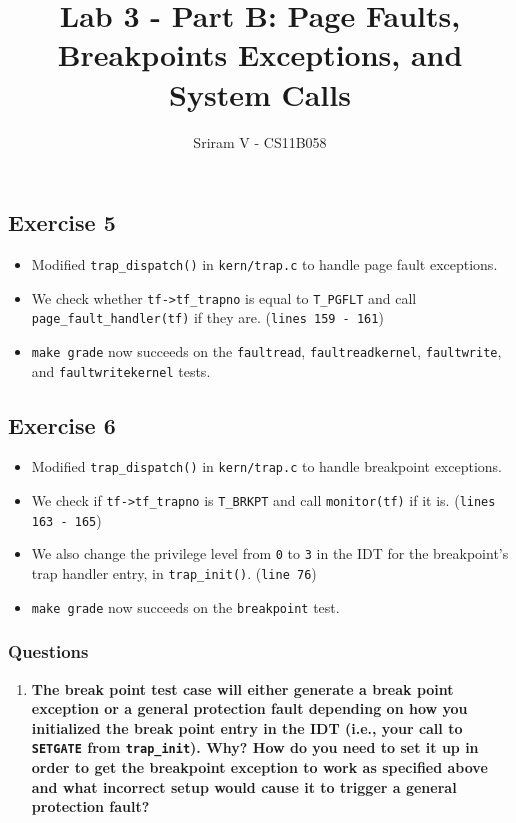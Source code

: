 \documentclass[]{article}
\title{Lab 3 - Part B: Page Faults, Breakpoints Exceptions, and System Calls}
\author{Sriram V - CS11B058}
\date{}
\begin{document}
\maketitle

\subsection{Exercise 5}

\begin{itemize}
\itemsep1pt\parskip0pt
\item
  Modified \texttt{trap\_dispatch()} in \texttt{kern/trap.c} to handle
  page fault exceptions.
\item
  We check whether \texttt{tf-\textgreater{}tf\_trapno} is equal to
  \texttt{T\_PGFLT} and call \texttt{page\_fault\_handler(tf)} if they
  are. (\texttt{lines 159 - 161})
\item
  \texttt{make grade} now succeeds on the \texttt{faultread},
  \texttt{faultreadkernel}, \texttt{faultwrite}, and
  \texttt{faultwritekernel} tests.
\end{itemize}

\subsection{Exercise 6}

\begin{itemize}
\itemsep1pt\parskip0pt
\item
  Modified \texttt{trap\_dispatch()} in \texttt{kern/trap.c} to handle
  breakpoint exceptions.
\item
  We check if \texttt{tf-\textgreater{}tf\_trapno} is \texttt{T\_BRKPT}
  and call \texttt{monitor(tf)} if it is. (\texttt{lines 163 - 165})
\item
  We also change the privilege level from \texttt{0} to \texttt{3} in
  the IDT for the breakpoint's trap handler entry, in
  \texttt{trap\_init()}. (\texttt{line 76})
\item
  \texttt{make grade} now succeeds on the \texttt{breakpoint} test.
\end{itemize}

\subsubsection{Questions}

\begin{enumerate}
\def\labelenumi{\arabic{enumi}.}
\setcounter{enumi}{2}
\itemsep1pt\parskip0pt
\item
  \textbf{The break point test case will either generate a break point
  exception or a general protection fault depending on how you
  initialized the break point entry in the IDT (i.e., your call to
  \texttt{SETGATE} from \texttt{trap\_init}). Why? How do you need to
  set it up in order to get the breakpoint exception to work as
  specified above and what incorrect setup would cause it to trigger a
  general protection fault?}
\end{enumerate}
\end{document}
